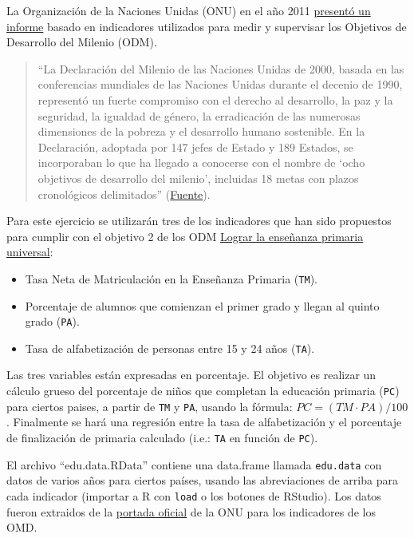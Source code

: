 \documentclass[]{article}
\begin{document}
La Organización de la Naciones Unidas (ONU) en el año 2011
\href{http://mdgs.un.org/unsd/mdg/Resources/Static/Products/Progress2011/11-31342\%20\%28S\%29\%20MDG\%20Report\%202011\_Book\%20LR.pdf}{presentó
un informe} basado en indicadores utilizados para medir y supervisar los
Objetivos de Desarrollo del Milenio (ODM).

\begin{quote}
``La Declaración del Milenio de las Naciones Unidas de 2000, basada en
las conferencias mundiales de las Naciones Unidas durante el decenio de
1990, representó un fuerte compromiso con el derecho al desarrollo, la
paz y la seguridad, la igualdad de género, la erradicación de las
numerosas dimensiones de la pobreza y el desarrollo humano sostenible.
En la Declaración, adoptada por 147 jefes de Estado y 189 Estados, se
incorporaban lo que ha llegado a conocerse con el nombre de `ocho
objetivos de desarrollo del milenio', incluidas 18 metas con plazos
cronológicos delimitados''
(\href{http://unstats.un.org/unsd/publication/seriesf/Seriesf\_95s.pdf}{Fuente}).
\end{quote}

Para este ejercicio se utilizarán tres de los indicadores que han sido
propuestos para cumplir con el objetivo 2 de los ODM
\href{http://www.undp.org/content/undp/es/home/mdgoverview/mdg\_goals/mdg2/}{Lograr
la enseñanza primaria universal}:

\begin{itemize}
\item
  Tasa Neta de Matriculación en la Enseñanza Primaria (\texttt{TM}).
\item
  Porcentaje de alumnos que comienzan el primer grado y llegan al quinto
  grado (\texttt{PA}).
\item
  Tasa de alfabetización de personas entre 15 y 24 años (\texttt{TA}).
\end{itemize}

Las tres variables están expresadas en porcentaje. El objetivo es
realizar un cálculo grueso del porcentaje de niños que completan la
educación primaria (\texttt{PC}) para ciertos paises, a partir de
\texttt{TM} y \texttt{PA}, usando la fórmula:
$PC = (TM \cdot PA) / 100$. Finalmente se hará una regresión entre la
tasa de alfabetización y el porcentaje de finalización de primaria
calculado (i.e.: \texttt{TA} en función de \texttt{PC}).

El archivo ``edu.data.RData'' contiene una data.frame llamada
\texttt{edu.data} con datos de varios años para ciertos países, usando
las abreviaciones de arriba para cada indicador (importar a R con
\texttt{load} o los botones de RStudio). Los datos fueron extraidos de
la \href{http://mdgs.un.org/unsd/mdg/Data.aspx}{portada oficial} de la
ONU para los indicadores de los OMD.
\end{document}
